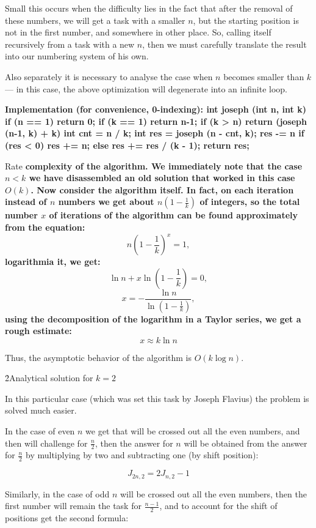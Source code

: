 Small this occurs when the difficulty lies in the fact that after the removal of these numbers, we will get a task with a smaller $n$, but the starting position is not in the first number, and somewhere in other place. So, calling itself recursively from a task with a new $n$, then we must carefully translate the result into our numbering system of his own.

Also separately it is necessary to analyse the case when $n$ becomes smaller than $k$ --- in this case, the above optimization will degenerate into an infinite loop.

\bf{Implementation} (for convenience, 0-indexing):
\code
int joseph (int n, int k) {
if (n == 1) return 0;
if (k == 1) return n-1;
if (k > n) return (joseph (n-1, k) + k) %
int cnt = n / k;
int res = joseph (n - cnt, k);
res -= n %
if (res < 0) res += n;
else res += res / (k - 1);
return res;
}
\endcode

Rate \bf{complexity} of the algorithm. We immediately note that the case $n < k$ we have disassembled an old solution that worked in this case $O(k)$. Now consider the algorithm itself. In fact, on each iteration instead of $n$ numbers we get about $n \left( 1 - \frac{1}{k} \right)$ of integers, so the total number $x$ of iterations of the algorithm can be found approximately from the equation:
$$ n \left( 1 - \frac{1}{k} \right) ^ x = 1, $$
logarithmia it, we get:
$$ \ln n + x \ln \left( 1 - \frac{1}{k} \right) = 0, $$
$$ x = - \frac{ \ln n }{ \ln \left( 1 - \frac{1}{k} \right) }, $$
using the decomposition of the logarithm in a Taylor series, we get a rough estimate:
$$ x \approx k \ln n $$

Thus, the asymptotic behavior of the algorithm is $O(k \log n)$.

\h2{Analytical solution for $k=2$}

In this particular case (which was set this task by Joseph Flavius) the problem is solved much easier.

In the case of even $n$ we get that will be crossed out all the even numbers, and then will challenge for $\frac{n}{2}$, then the answer for $n$ will be obtained from the answer for $\frac{n}{2}$ by multiplying by two and subtracting one (by shift position):

$$ J_{2n,2} = 2 J_{n,2} - 1 $$

Similarly, in the case of odd $n$ will be crossed out all the even numbers, then the first number will remain the task for $\frac{n-1}{2}$, and to account for the shift of positions get the second formula:

